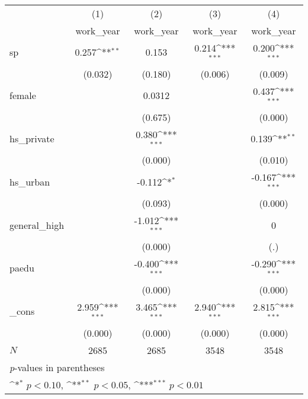 {
\def\sym#1{\ifmmode^{#1}\else\(^{#1}\)\fi}
\begin{tabular}{l*{4}{c}}
\hline\hline
            &\multicolumn{1}{c}{(1)}&\multicolumn{1}{c}{(2)}&\multicolumn{1}{c}{(3)}&\multicolumn{1}{c}{(4)}\\
            &\multicolumn{1}{c}{work\_year}&\multicolumn{1}{c}{work\_year}&\multicolumn{1}{c}{work\_year}&\multicolumn{1}{c}{work\_year}\\
\hline
sp          &       0.257\sym{**} &       0.153         &       0.214\sym{***}&       0.200\sym{***}\\
            &     (0.032)         &     (0.180)         &     (0.006)         &     (0.009)         \\
[1em]
female      &                     &      0.0312         &                     &       0.437\sym{***}\\
            &                     &     (0.675)         &                     &     (0.000)         \\
[1em]
hs\_private  &                     &       0.380\sym{***}&                     &       0.139\sym{**} \\
            &                     &     (0.000)         &                     &     (0.010)         \\
[1em]
hs\_urban    &                     &      -0.112\sym{*}  &                     &      -0.167\sym{***}\\
            &                     &     (0.093)         &                     &     (0.000)         \\
[1em]
general\_high&                     &      -1.012\sym{***}&                     &           0         \\
            &                     &     (0.000)         &                     &         (.)         \\
[1em]
paedu       &                     &      -0.400\sym{***}&                     &      -0.290\sym{***}\\
            &                     &     (0.000)         &                     &     (0.000)         \\
[1em]
\_cons      &       2.959\sym{***}&       3.465\sym{***}&       2.940\sym{***}&       2.815\sym{***}\\
            &     (0.000)         &     (0.000)         &     (0.000)         &     (0.000)         \\
\hline
\(N\)       &        2685         &        2685         &        3548         &        3548         \\
\hline\hline
\multicolumn{5}{l}{\footnotesize \textit{p}-values in parentheses}\\
\multicolumn{5}{l}{\footnotesize \sym{*} \(p<0.10\), \sym{**} \(p<0.05\), \sym{***} \(p<0.01\)}\\
\end{tabular}
}
